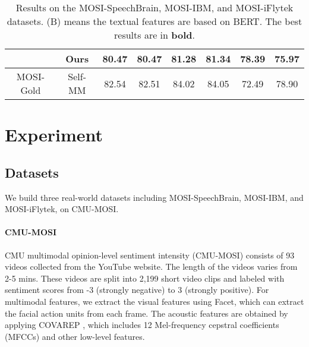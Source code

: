 \documentclass[11pt]{article}
\begin{document}
\begin{table*}[tbp]
{\begin{tabular}{l|l|llllll}
		  \cline{2-8}
		  & \multicolumn{1}{c|}{Ours} & \multicolumn{1}{c}{\textbf{80.47}} & \multicolumn{1}{c}{\textbf{80.47}} &  \multicolumn{1}{c}{\textbf{81.28}} & \multicolumn{1}{c}{\textbf{81.34}} & \multicolumn{1}{c}{\textbf{78.39}}       & \multicolumn{1}{c}{\textbf{75.97}} \\
		  \hline
		  \multicolumn{1}{c|}{MOSI-Gold}  & \multicolumn{1}{c|}{Self-MM} & \multicolumn{1}{c}{82.54} & \multicolumn{1}{c}{82.51} &  \multicolumn{1}{c}{84.02} & \multicolumn{1}{c}{84.05} & \multicolumn{1}{c}{72.49}       & \multicolumn{1}{c}{78.90} \\
		  \hline
        \end{tabular}
    }
    \caption{Results on the MOSI-SpeechBrain, MOSI-IBM, and MOSI-iFlytek datasets. (B) means the textual features are based on BERT. The best results are in \textbf{bold}.}
	\label{tab:main_mosi}
\end{table*}








\section{Experiment}

\subsection{Datasets}
We build three real-world datasets including MOSI-SpeechBrain, MOSI-IBM, and MOSI-iFlytek, on CMU-MOSI\cite{zadeh2016mosi}. 

\paragraph{CMU-MOSI} CMU multimodal opinion-level sentiment intensity (CMU-MOSI) consists of 93 videos collected from the YouTube website. The length of the videos varies from 2-5 mins. These videos are split into 2,199 short video clips and labeled with sentiment scores from -3 (strongly negative) to 3 (strongly positive). For multimodal features, we extract the visual features using Facet, which can extract the facial action units \cite{ekman1980facial} from each frame. The acoustic features are obtained by applying COVAREP \cite{degottex2014covarep}, which includes 12 Mel-frequency cepstral coefficients (MFCCs) and other low-level features. 
\end{document}
